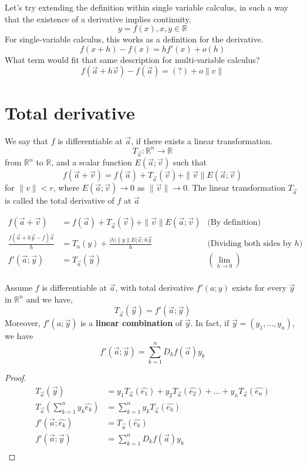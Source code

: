 \documentclass[twoside]{report}
\begin{document}
Let's try extending the definition within single variable calculus, in such a way that the existence of a derivative implies continuity.
\[
   y = f(x) , x,y \in \mathbb{R}
\]
For single-variable calculus, this works as a definition for the derivative.
\[
	f(x+h) - f(x) = hf'(x) + o(h)
\]
What term would fit that same description for multi-variable calculus?
\[
   f(\vec{a} + h\vec{v}) - f(\vec{a}) = (?) + o \|v\|
\]
\section{Total derivative}
\begin{definition}
   We say that $f$ is differentiable at $\vec{a}$, if there exists a linear transformation. 
   \[
      T_{\vec{a}} : \mathbb{R}^n \rightarrow \mathbb{R}
   \]
   from $\mathbb{R}^n$ to $\mathbb{R}$, and a scalar function $E(\vec{a};\vec{v})$ such that 
   \[
      f(\vec{a} + \vec{v}) = f(\vec{a}) + T_{\vec{a}}(\vec{v}) + \|\vec{v}\| E(\vec{a};\vec{v})
   \]
   for $\|v\| < r$, where $E(\vec{a};\vec{v}) \rightarrow 0$ as $\|\vec{v}\| \rightarrow 0$. The linear transformation $T_{\vec{a}}$ is called the total derivative of $f$ at $\vec{a}$ 
\end{definition}
\begin{align*}
   f(\vec{a} + \vec{v}) &= f(\vec{a}) + T_{\vec{a}}(\vec{v}) + \|\vec{v}\| E(\vec{a};\vec{v}) &\text{(By definition)}\\
   \frac{f(\vec{a} + h\vec{y} - f)\vec{a}}{h} &= T_a(y) + \frac{|h|\|y\|E(\vec{a};h\vec{y}}{h} &\text{(Dividing both sides by $h$)} \\
f'(\vec{a};\vec{y}) &= T_{\vec{a}}(\vec{y})  &(\lim_{h \rightarrow 0}) \\
\end{align*}

\begin{theorem}
   Assume $f$ is differentiable at $\vec{a}$, with total derivative $f'(a;y)$ exists for every $\vec{y}$ in $\mathbb{R}^n$ and we have,
   \[
      T_{\vec{a}}(\vec{y}) = f'(\vec{a};\vec{y})
   \]
   Moreover, $f'(a;\vec{y})$ is a \textbf{linear combination} of $\vec{y}$. In fact, if $\vec{y} = (y_1,\dots, y_n)$, we have 
   \[
      f'(\vec{a};\vec{y}) = \sum_{k=1}^{n} D_k f(\vec{a}) y_k
   \]
\end{theorem}
\begin{proof}
\begin{align*}
   T_{\vec{a}}(\vec{y}) &= y_1 T_{\vec{a}}(\hat{e_1}) + y_2 T_{\vec{a}}(\hat{e_2}) +  \dots + y_n T_{\vec{a}}(\hat{e_n}) \\
   T_{\vec{a}}(\sum_{k=1}^{n}y_k\hat{e_k}) &= \sum_{k=1}^{n} y_k T_{\vec{a}}(\hat{e_k}) \\
   f'(\vec{a};\hat{e_k}) &= T_{\vec{a}}(\hat{e_k}) \\
   f'(\vec{a};\vec{y}) &= \sum_{k=1}^{n} D_k f(\vec{a}) y_k  \\
\end{align*}
\end{proof}
\end{document}

